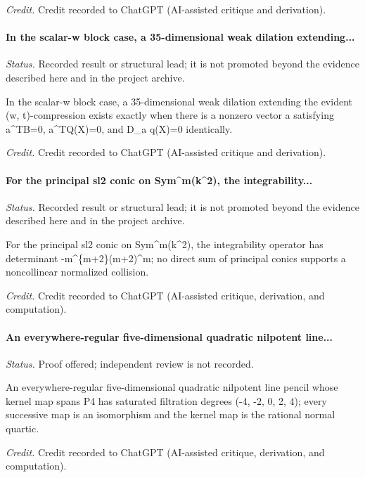 \emph{Credit.} Credit recorded to ChatGPT (AI-assisted critique and derivation).

\label{supp-note-05-029}
\paragraph{In the scalar-w block case, a 35-dimensional weak dilation extending...}
\emph{Status.} Recorded result or structural lead; it is not promoted beyond the evidence described here and in the project archive.

In the scalar-w block case, a 35-dimensional weak dilation extending the evident (w, t)-compression exists exactly when there is a nonzero vector a satisfying a\textasciicircum{}TB=0, a\textasciicircum{}TQ(X)=0, and D\_a q(X)=0 identically.

\emph{Credit.} Credit recorded to ChatGPT (AI-assisted critique and derivation).

\label{supp-note-05-030}
\paragraph{For the principal sl2 conic on Sym\textasciicircum{}m(k\textasciicircum{}2), the integrability...}
\emph{Status.} Recorded result or structural lead; it is not promoted beyond the evidence described here and in the project archive.

For the principal sl2 conic on Sym\textasciicircum{}m(k\textasciicircum{}2), the integrability operator has determinant -m\textasciicircum{}\{m+2\}(m+2)\textasciicircum{}m; no direct sum of principal conics supports a noncollinear normalized collision.

\emph{Credit.} Credit recorded to ChatGPT (AI-assisted critique, derivation, and computation).

\label{supp-note-05-031}
\paragraph{An everywhere-regular five-dimensional quadratic nilpotent line...}
\emph{Status.} Proof offered; independent review is not recorded.

An everywhere-regular five-dimensional quadratic nilpotent line pencil whose kernel map spans P4 has saturated filtration degrees (-4, -2, 0, 2, 4); every successive map is an isomorphism and the kernel map is the rational normal quartic.

\emph{Credit.} Credit recorded to ChatGPT (AI-assisted critique, derivation, and computation).

